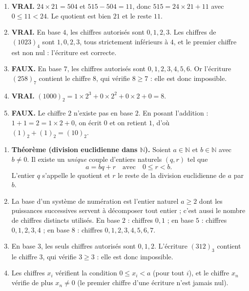 \documentclass[11pt]{article}
\newcommand{\cle}[1]{{\popxbold\color{popdark}#1}}
\begin{document}
\begin{corrige}
\begin{enumerate}
\item \textbf{VRAI.} $24 \times 21 = 504$ et $515 - 504 = 11$, donc $515 = 24 \times 21 + 11$ avec $0 \le 11 < 24$. Le quotient est bien $21$ et le reste $11$.
\item \textbf{VRAI.} En base $4$, les chiffres autorisés sont $0, 1, 2, 3$. Les chiffres de $(1023)_4$ sont $1, 0, 2, 3$, tous strictement inférieurs à $4$, et le premier chiffre est non nul : l'écriture est correcte.
\item \textbf{FAUX.} En base $7$, les chiffres autorisés sont $0, 1, 2, 3, 4, 5, 6$. Or l'écriture $(258)_7$ contient le chiffre $8$, qui vérifie $8 \ge 7$ : elle est donc impossible.
\item \textbf{VRAI.} $(1000)_2 = 1 \times 2^3 + 0 \times 2^2 + 0 \times 2 + 0 = 8$.
\item \textbf{FAUX.} Le chiffre $2$ n'existe pas en base $2$. En posant l'addition : $1 + 1 = 2 = 1 \times 2 + 0$, on écrit $0$ et on retient $1$, d'où $(1)_2 + (1)_2 = (10)_2$.
\end{enumerate}
\end{corrige}

\begin{corrige}
\begin{enumerate}
\item \textbf{Théorème (division euclidienne dans $\mathbb{N}$).} Soient $a \in \mathbb{N}$ et $b \in \mathbb{N}$ avec $b \neq 0$. Il existe un \emph{unique} couple d'entiers naturels $(q, r)$ tel que
\[ a = bq + r \quad \text{avec} \quad 0 \le r < b. \]
L'entier $q$ s'appelle le \cle{quotient} et $r$ le \cle{reste} de la division euclidienne de $a$ par $b$.
\item La \cle{base} d'un système de numération est l'entier naturel $a \ge 2$ dont les puissances successives servent à décomposer tout entier ; c'est aussi le nombre de chiffres distincts utilisés. En base $2$ : chiffres $0, 1$ ; en base $5$ : chiffres $0, 1, 2, 3, 4$ ; en base $8$ : chiffres $0, 1, 2, 3, 4, 5, 6, 7$.
\item En base $3$, les seuls chiffres autorisés sont $0, 1, 2$. L'écriture $(312)_3$ contient le chiffre $3$, qui vérifie $3 \ge 3$ : elle est donc impossible.
\item Les chiffres $x_i$ vérifient la condition $0 \le x_i < a$ (pour tout $i$), et le chiffre $x_n$ vérifie de plus $x_n \neq 0$ (le premier chiffre d'une écriture n'est jamais nul).
\end{enumerate}
\end{corrige}
\end{document}
